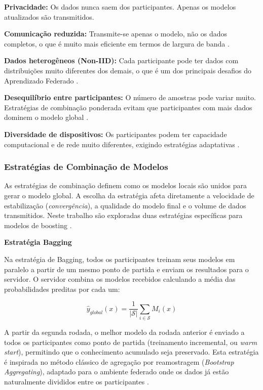 \textbf{Privacidade:} Os dados nunca saem dos participantes. Apenas os modelos atualizados são transmitidos.

\textbf{Comunicação reduzida:} Transmite-se apenas o modelo, não os dados completos, o que é muito mais eficiente em termos de largura de banda \cite{konecny2016communication}.

\textbf{Dados heterogêneos (Non-IID):} Cada participante pode ter dados com distribuições muito diferentes dos demais, o que é um dos principais desafios do Aprendizado Federado \cite{zhu2021noniid}.

\textbf{Desequilíbrio entre participantes:} O número de amostras pode variar muito. Estratégias de combinação ponderada evitam que participantes com mais dados dominem o modelo global \cite{chai2024survey}.

\textbf{Diversidade de dispositivos:} Os participantes podem ter capacidade computacional e de rede muito diferentes, exigindo estratégias adaptativas \cite{bonawitz2019scale}.


\subsubsection{Estratégias de Combinação de Modelos}

As estratégias de combinação definem como os modelos locais são unidos para gerar o modelo global. A escolha da estratégia afeta diretamente a velocidade de estabilização (\textit{convergência}), a qualidade do modelo final e o volume de dados transmitidos. Neste trabalho são exploradas duas estratégias específicas para modelos de boosting \cite{flower2020}.

\textbf{Estratégia Bagging}

Na estratégia de Bagging, todos os participantes treinam seus modelos em paralelo a partir de um mesmo ponto de partida e enviam os resultados para o servidor. O servidor combina os modelos recebidos calculando a média das probabilidades preditas por cada um:

\begin{equation}
\hat{y}_{global}(x) = \frac{1}{|\mathcal{S}|} \sum_{i \in \mathcal{S}} M_i(x)
\end{equation}

A partir da segunda rodada, o melhor modelo da rodada anterior é enviado a todos os participantes como ponto de partida (treinamento incremental, ou \textit{warm start}), permitindo que o conhecimento acumulado seja preservado. Esta estratégia é inspirada no método clássico de agregação por reamostragem (\textit{Bootstrap Aggregating}), adaptado para o ambiente federado onde os dados já estão naturalmente divididos entre os participantes \cite{liu2020fedforest}.

